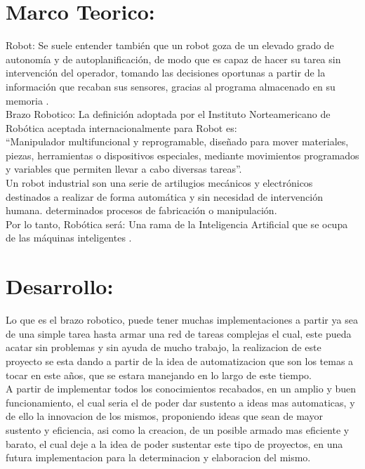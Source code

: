 \documentclass[14pt,a4paper]{article}
\begin{document}
\section{Marco Teorico:}

Robot:
Se suele entender también que un robot goza de un elevado grado de autonomía y de autoplanificación, de modo que es capaz de hacer su tarea sin intervención del operador, tomando las decisiones oportunas a partir de la información que recaban sus sensores, gracias al programa almacenado en su memoria \citep{turiel2002aplicaciones} .\\ 

Brazo Robotico:
La definición adoptada por el Instituto Norteamericano de Robótica aceptada internacionalmente para Robot es:\\

“Manipulador multifuncional y reprogramable, diseñado para mover materiales, piezas, herramientas o dispositivos especiales, mediante movimientos programados y variables que permiten llevar a cabo diversas tareas”.\\
Un robot industrial son una serie de artilugios mecánicos y electrónicos destinados a realizar de forma automática y sin necesidad de intervención humana. determinados procesos de fabricación o manipulación.\\
Por lo tanto, Robótica será:  Una rama de la Inteligencia Artificial que se ocupa de las máquinas inteligentes \citep{cardenas2015diseno}.
\newpage

\section{Desarrollo:}

Lo que es el brazo robotico, puede tener muchas implementaciones a partir ya sea de una simple tarea hasta armar una red de tareas complejas el cual, este pueda acatar sin problemas y sin ayuda de mucho trabajo, la realizacion de este proyecto se esta dando a partir de la idea de automatizacion que son los temas a tocar en este años, que se estara manejando en lo largo de este tiempo.\\
A partir de implementar todos los conocimientos recabados, en un amplio y buen funcionamiento, el cual seria el de poder dar sustento a ideas mas automaticas, y de ello la innovacion de los mismos, proponiendo ideas que sean de mayor sustento y eficiencia, asi como la creacion, de un posible armado mas eficiente y barato, el cual deje a la idea de poder sustentar este tipo de proyectos, en una futura implementacion para la determinacion y elaboracion del mismo.
\end{document}
